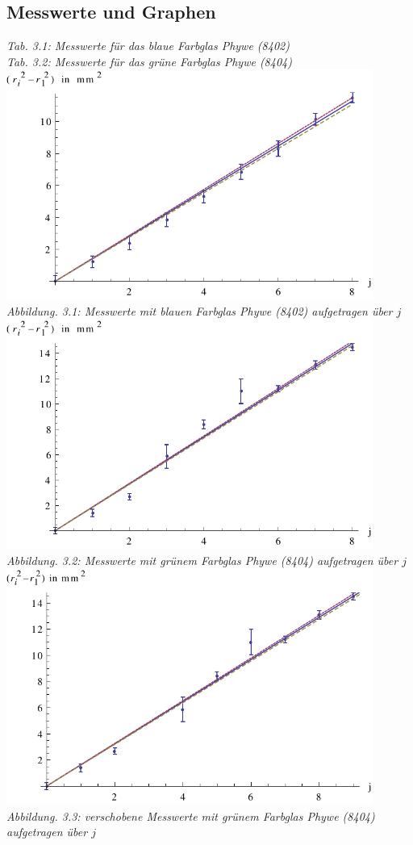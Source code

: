 \subsection{Messwerte und Graphen}
\begin{center}

{\it Tab. 3.1: Messwerte für das blaue Farbglas Phywe (8402)}
\vspace{5mm}
\\

{\it Tab. 3.2: Messwerte für das grüne Farbglas Phywe (8404)}
\\
\includegraphics[width=12cm]{graphen/blau}
{\it Abbildung. 3.1: Messwerte mit blauen Farbglas Phywe (8402) aufgetragen über \(j\)}
\\
\includegraphics[width=12cm]{graphen/gruen}
{\it Abbildung. 3.2: Messwerte mit grünem Farbglas Phywe (8404) aufgetragen über \(j\)}
\\
\includegraphics[width=12cm]{graphen/gruen_new}
{\it Abbildung. 3.3: verschobene Messwerte mit grünem Farbglas Phywe (8404) aufgetragen über \(j\)}

\end{center}
